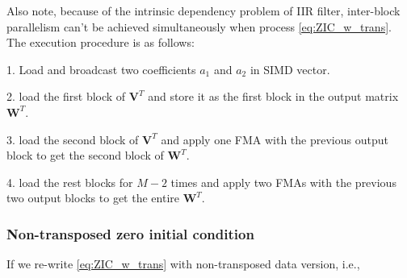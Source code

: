 Also note, because of the intrinsic dependency problem of IIR filter, inter-block parallelism can't be achieved simultaneously
when process \eqref{eq:ZIC_w_trans}. The execution procedure is as follows:

1. Load and broadcast two coefficients $a_1$ and $a_2$ in SIMD vector.

2. load the first block of $\bm{V}^T$ and store it as the first block in the output matrix $\bm{W}^T$.

3. load the second block of $\bm{V}^T$ and apply one FMA with the previous output block to get the second block of $\bm{W}^T$. 

4. load the rest blocks for $M{-}2$ times and apply two FMAs with the previous two output blocks to get the entire $\bm{W}^T$.

\subsubsection{Non-transposed zero initial condition}
If we re-write \eqref{eq:ZIC_w_trans} with non-transposed data version, i.e.,

